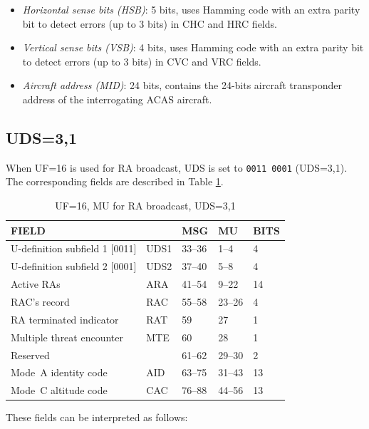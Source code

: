 \begin{itemize}
  \item \emph{Horizontal sense bits (HSB)}: 5 bits, uses Hamming code with an extra parity bit to detect errors (up to 3 bits) in CHC and HRC fields.

  \item \emph{Vertical sense bits (VSB)}: 4 bits, uses Hamming code with an extra parity bit to detect errors (up to 3 bits) in CVC and VRC fields.

  \item \emph{Aircraft address (MID)}: 24 bits, contains the 24-bits aircraft transponder address of the interrogating ACAS aircraft.

\end{itemize}



\subsection{UDS=3,1} \label{sec:acas_ra}

When UF=16 is used for RA broadcast, UDS is set to \texttt{0011 0001} (UDS=3,1). The corresponding fields are described in Table \ref{tb:acas_mu_uds31}.

\begin{table}[ht]
\caption{UF=16, MU for RA broadcast, UDS=3,1}
\label{tb:acas_mu_uds31}
\begin{tabular}{|l|l|l|l|l|}
\hline
\textbf{FIELD} & \textbf{} & \textbf{MSG} & \textbf{MU} & \textbf{BITS} \\ \hline
U-definition subfield 1 [0011] & UDS1 & 33--36 & 1--4 & 4 \\ \hline
U-definition subfield 2 [0001] & UDS2 & 37--40 & 5--8 & 4 \\ \hline
Active RAs & ARA & 41--54 & 9--22 & 14 \\ \hline
RAC's record & RAC & 55--58 & 23--26 & 4 \\ \hline
RA terminated indicator & RAT & 59 & 27 & 1 \\ \hline
Multiple threat encounter & MTE & 60 & 28 & 1 \\ \hline
Reserved &  & 61--62 & 29--30 & 2 \\ \hline
Mode~A identity code & AID & 63--75 & 31--43 & 13 \\ \hline
Mode~C altitude code & CAC & 76--88 & 44--56 & 13 \\ \hline
\end{tabular}
\end{table}

These fields can be interpreted as follows:


